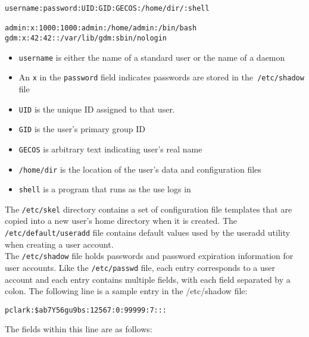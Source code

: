 \begin{verbatim}
username:password:UID:GID:GECOS:/home/dir/:shell

admin:x:1000:1000:admin:/home/admin:/bin/bash
gdm:x:42:42::/var/lib/gdm:sbin/nologin
\end{verbatim}

\begin{itemize}
\item \verb|username| is either the name of a standard user or the name of a daemon
\item An \verb|x| in the \verb|password| field indicates passwords are stored in the\verb| /etc/shadow| file
\item \verb|UID| is the unique ID assigned to that user.
\item \verb|GID| is the user's primary group ID
\item \verb|GECOS| is arbitrary text indicating user's real name
\item \verb|/home/dir| is the location of the user's data and configuration files
\item \verb|shell| is a program that runs as the use logs in
\end{itemize}

The \verb|/etc/skel| directory contains a set of configuration file templates that are copied into a new user's home directory when it is created. The \verb|/etc/default/useradd| file contains default values used by the useradd utility when creating a user account.\\

The \verb|/etc/shadow| file holds passwords and password expiration information for user accounts. Like the \verb|/etc/passwd| file, each entry corresponds to a user account and each entry contains multiple fields, with each field separated by a colon. The following line is a sample entry in the /etc/shadow file:

\begin{verbatim}
pclark:$ab7Y56gu9bs:12567:0:99999:7:::
\end{verbatim}

The fields within this line are as follows:

